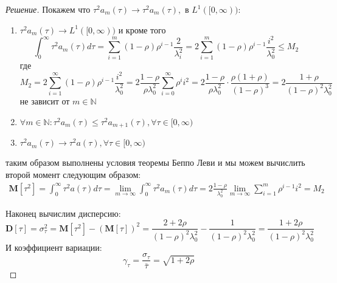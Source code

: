 \documentclass[12pt,a4paper]{article}
\newcommand{\mean}[1]{\mathbf{M}[#1]}
\begin{document}
\begin{proof}[Решение]
	Покажем что $\tau^2 a_m (\tau) \to \tau^2 a_m (\tau), \text{ в } L^1([0, \infty))$:
	\begin{enumerate}
		\item $\tau^2 a_m (\tau) \to L^1([0, \infty))$ и кроме того
		$$\int_{0}^{\infty}{\tau^2 a_m (\tau) d\tau} = \sum_{i=1}^{m}{(1-\rho)\rho^{i-1} \frac{2}{\lambda_i^2}} = 2 \sum_{i=1}^{m}{(1-\rho)\rho^{i-1} \frac{i^2}{\lambda_0^2}} \leq M_2$$
		где 
		$$M_2 = 2 \sum_{i=1}^{\infty}{(1-\rho)\rho^{i-1} \frac{i^2}{\lambda_0^2}} = 2\frac{1-\rho}{\rho \lambda_0^2} \sum_{i=0}^{\infty}{\rho^i i^2} = 2\frac{1-\rho}{\rho\lambda_0^2} \cdot \frac{\rho (1+\rho)}{(1-\rho)^3} = 2\frac{1+\rho}{(1-\rho)^2 \lambda_0^2}$$
		не зависит от $m \in \mathbb{N}$
	 	\item $\forall m \in \mathbb{N}: \tau^2 a_m (\tau) \leq \tau^2 a_{m+1} (\tau), \forall \tau \in [0, \infty)$
	 	\item $\tau^2 a_m (\tau) \to \tau^2 a (\tau), \forall \tau \in [0, \infty)$ 
	\end{enumerate}
	таким образом выполнены условия теоремы Беппо Леви и мы можем вычислить второй момент следующим образом:
	\begin{multline*}
		\mean{\tau^2} = \int_{0}^{\infty}{\tau^2 a(\tau) d\tau} = \lim_{m\to \infty}{\int_{0}^{\infty}{\tau^2 a_m(\tau) d\tau}} = 2\frac{1-\rho}{\lambda_0^2}\lim_{m\to\infty}{\sum_{i=1}^{m}{\rho^{i-1} i^2}} = M_2
	\end{multline*}
	
	Наконец вычислим дисперсию:
	$$\mathbf{D}[\tau] = \sigma^2_\tau = \mean{\tau^2} - (\mean{\tau})^2 = \frac{2 + 2\rho}{(1-\rho)^2 \lambda_0^2} - \frac{1}{(1-\rho)^2 \lambda_0^2} = \frac{1+2\rho}{(1-\rho)^2 \lambda_0^2}$$
	И коэффициент вариации:
	$$\gamma_\tau = \frac{\sigma_\tau}{\bar{\tau}} = \sqrt{1 + 2\rho}$$
\end{proof}
\end{document}
